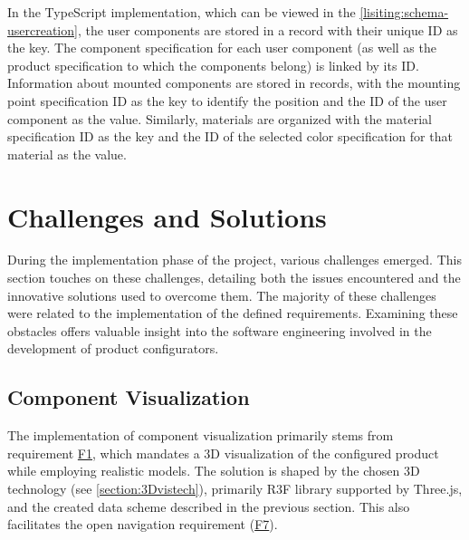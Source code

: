 In the TypeScript implementation, which can be viewed in the \autoref{lisiting:schema-usercreation}, the user components are stored in a record with their unique ID as the key. The component specification for each user component (as well as the product specification to which the components belong) is linked by its ID. Information about mounted components are stored in records, with the mounting point specification ID as the key to identify the position and the ID of the user component as the value. Similarly, materials are organized with the material specification ID as the key and the ID of the selected color specification for that material as the value.


\section{Challenges and Solutions}

During the implementation phase of the project, various challenges emerged. This section touches on these challenges, detailing both the issues encountered and the innovative solutions used to overcome them. The majority of these challenges were related to the implementation of the defined requirements. Examining these obstacles offers valuable insight into the software engineering involved in the development of product configurators.


\subsection{Component Visualization}

The implementation of component visualization primarily stems from requirement \hyperref[itm:F1]{F1}, which mandates a 3D visualization of the configured product while employing realistic models. The solution is shaped by the chosen 3D technology (see \autoref{section:3Dvistech}), primarily R3F library supported by Three.js, and the created data scheme described in the previous section. This also facilitates the open navigation requirement (\hyperref[itm:F7]{F7}).

